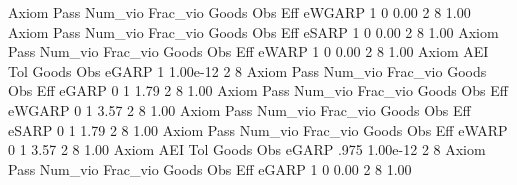 {\smallskip}
       Axiom {\VBAR} Pass     Num_vio    Frac_vio       Goods         Obs         Eff  
      eWGARP {\VBAR}    1           0        0.00           2           8        1.00  
{\smallskip}
{\smallskip}
{\smallskip}
       Axiom {\VBAR} Pass     Num_vio    Frac_vio       Goods         Obs         Eff  
       eSARP {\VBAR}    1           0        0.00           2           8        1.00  
{\smallskip}
{\smallskip}
{\smallskip}
       Axiom {\VBAR} Pass     Num_vio    Frac_vio       Goods         Obs         Eff  
       eWARP {\VBAR}    1           0        0.00           2           8        1.00  
{\smallskip}
       Axiom {\VBAR}       AEI        Tol      Goods        Obs 
       eGARP {\VBAR}         1   1.00e-12          2          8 
{\smallskip}
{\smallskip}
{\smallskip}
       Axiom {\VBAR} Pass     Num_vio    Frac_vio       Goods         Obs         Eff  
       eGARP {\VBAR}    0           1        1.79           2           8        1.00  
{\smallskip}
{\smallskip}
{\smallskip}
       Axiom {\VBAR} Pass     Num_vio    Frac_vio       Goods         Obs         Eff  
      eWGARP {\VBAR}    0           1        3.57           2           8        1.00  
{\smallskip}
{\smallskip}
{\smallskip}
       Axiom {\VBAR} Pass     Num_vio    Frac_vio       Goods         Obs         Eff  
       eSARP {\VBAR}    0           1        1.79           2           8        1.00  
{\smallskip}
{\smallskip}
{\smallskip}
       Axiom {\VBAR} Pass     Num_vio    Frac_vio       Goods         Obs         Eff  
       eWARP {\VBAR}    0           1        3.57           2           8        1.00  
{\smallskip}
       Axiom {\VBAR}       AEI        Tol      Goods        Obs 
       eGARP {\VBAR}      .975   1.00e-12          2          8 
{\smallskip}
{\smallskip}
{\smallskip}
       Axiom {\VBAR} Pass     Num_vio    Frac_vio       Goods         Obs         Eff  
       eGARP {\VBAR}    1           0        0.00           2           8        1.00  
